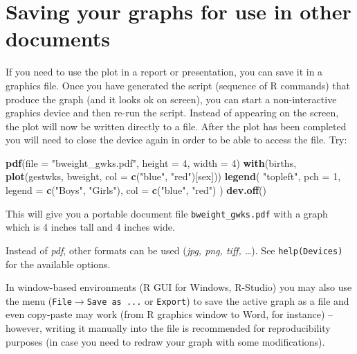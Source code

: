 \documentclass[
]{book}
\newenvironment{Shaded}{\begin{snugshade}}{\end{snugshade}}
\newcommand{\AttributeTok}[1]{\textcolor[rgb]{0.13,0.29,0.53}{#1}}
\newcommand{\DecValTok}[1]{\textcolor[rgb]{0.00,0.00,0.81}{#1}}
\newcommand{\FunctionTok}[1]{\textcolor[rgb]{0.13,0.29,0.53}{\textbf{#1}}}
\newcommand{\NormalTok}[1]{#1}
\newcommand{\StringTok}[1]{\textcolor[rgb]{0.31,0.60,0.02}{#1}}
\begin{document}
\section{Saving your graphs for use in other documents}\label{saving-your-graphs-for-use-in-other-documents}

If you need to use the plot in a report or presentation, you can save it in a graphics file.
Once you have generated the script (sequence of R commands) that produce the graph (and it looks ok on screen),
you can start a non-interactive graphics device and then re-run the script.
Instead of appearing on the screen, the plot will now be written
directly to a file. After the plot has been completed you will need
to close the device again in order to be able to access the file. Try:

\begin{Shaded}
\begin{Highlighting}[]
\FunctionTok{pdf}\NormalTok{(}\AttributeTok{file =} \StringTok{"bweight\_gwks.pdf"}\NormalTok{, }\AttributeTok{height =} \DecValTok{4}\NormalTok{, }\AttributeTok{width =} \DecValTok{4}\NormalTok{)}
\FunctionTok{with}\NormalTok{(births, }\FunctionTok{plot}\NormalTok{(gestwks, bweight, }\AttributeTok{col =} \FunctionTok{c}\NormalTok{(}\StringTok{"blue"}\NormalTok{, }\StringTok{"red"}\NormalTok{)[sex]))}
\FunctionTok{legend}\NormalTok{(}
  \StringTok{"topleft"}\NormalTok{, }
  \AttributeTok{pch =} \DecValTok{1}\NormalTok{, }
  \AttributeTok{legend =} \FunctionTok{c}\NormalTok{(}\StringTok{"Boys"}\NormalTok{, }\StringTok{"Girls"}\NormalTok{), }
  \AttributeTok{col =} \FunctionTok{c}\NormalTok{(}\StringTok{"blue"}\NormalTok{, }\StringTok{"red"}\NormalTok{)}
\NormalTok{)}
\FunctionTok{dev.off}\NormalTok{()}
\end{Highlighting}
\end{Shaded}

This will give you a portable document file \texttt{bweight\_gwks.pdf} with a graph
which is 4 inches tall and 4 inches wide.

Instead of \emph{pdf}, other formats can be used (\emph{jpg, png, tiff, \ldots{}}). See \texttt{help(Devices)} for the available options.

In window-based environments (R GUI for Windows, R-Studio) you may also use the menu
(\texttt{File}\(\rightarrow\)\texttt{Save\ as\ ...} or \texttt{Export}) to save the active graph as a file and even copy-paste may work (from R graphics window to Word, for instance) -- however, writing it manually into the file is recommended for reproducibility purposes (in case you need to redraw your graph with some modifications).
\end{document}
